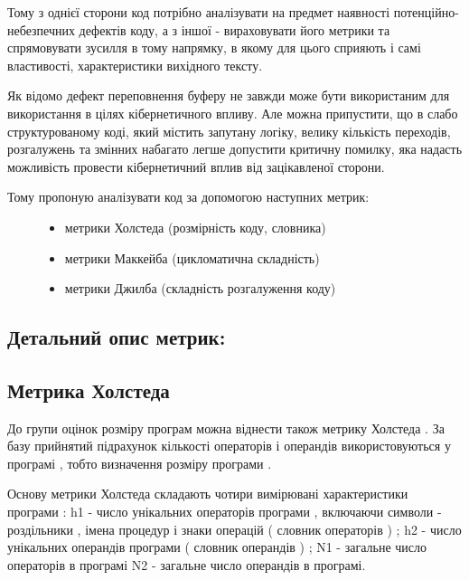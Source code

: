 \documentclass[oneside,final,14pt]{extreport}
\begin{document}
Тому з однієї сторони код потрібно аналізувати на предмет наявності потенційно-небезпечних дефектів коду, а з іншої - вираховувати його метрики та спрямовувати зусилля в тому напрямку, в якому для цього сприяють і самі властивості, характеристики вихідного тексту.

Як відомо дефект переповнення буферу не завжди може бути використаним для використання в цілях кібернетичного впливу.
Але можна припустити, що в слабо структурованому коді, який містить запутану логіку, велику кількість переходів, розгалужень та змінних набагато легше допустити критичну помилку, яка надасть можливість провести кібернетичний вплив від зацікавленої сторони.
\begin{description}
\item[{Тому пропоную аналізувати код за допомогою наступних метрик:}] \leavevmode\begin{itemize}
\item {} 
метрики Холстеда (розмірність коду, словника)

\item {} 
метрики Маккейба (цикломатична складність)

\item {} 
метрики Джилба (складність розгалуження коду)

\end{itemize}

\end{description}


\subsection{Детальний опис метрик:}
\label{2section:id9}

\subsection{Метрика Холстеда}
\label{2section:id10}
До групи оцінок розміру програм можна віднести також метрику Холстеда . За базу прийнятий підрахунок кількості операторів і операндів використовуються у програмі , тобто визначення розміру програми .

Основу метрики Холстеда складають чотири вимірювані характеристики програми : h1 - число унікальних операторів програми , включаючи символи - роздільники , імена процедур і знаки операцій ( словник операторів ) ; h2 - число унікальних операндів програми ( словник операндів ) ; N1 - загальне число операторів в програмі N2 - загальне число операндів в програмі.
\end{document}
